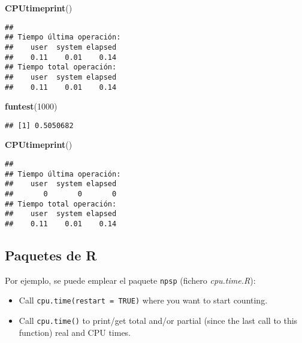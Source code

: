 \documentclass[
]{book}
\newenvironment{Shaded}{\begin{snugshade}}{\end{snugshade}}
\newcommand{\DecValTok}[1]{\textcolor[rgb]{0.00,0.00,0.81}{#1}}
\newcommand{\KeywordTok}[1]{\textcolor[rgb]{0.13,0.29,0.53}{\textbf{#1}}}
\newcommand{\NormalTok}[1]{#1}
\theoremstyle{break}
\theoremstyle{definition}
\theoremstyle{definition}
\theoremstyle{definition}
\theoremstyle{remark}
\begin{document}
\begin{Shaded}
\begin{Highlighting}[]
\KeywordTok{CPUtimeprint}\NormalTok{()}
\end{Highlighting}
\end{Shaded}

\begin{verbatim}
## 
## Tiempo última operación:
##    user  system elapsed 
##    0.11    0.01    0.14 
## Tiempo total operación:
##    user  system elapsed 
##    0.11    0.01    0.14
\end{verbatim}

\begin{Shaded}
\begin{Highlighting}[]
\KeywordTok{funtest}\NormalTok{(}\DecValTok{1000}\NormalTok{)}
\end{Highlighting}
\end{Shaded}

\begin{verbatim}
## [1] 0.5050682
\end{verbatim}

\begin{Shaded}
\begin{Highlighting}[]
\KeywordTok{CPUtimeprint}\NormalTok{()}
\end{Highlighting}
\end{Shaded}

\begin{verbatim}
## 
## Tiempo última operación:
##    user  system elapsed 
##       0       0       0 
## Tiempo total operación:
##    user  system elapsed 
##    0.11    0.01    0.14
\end{verbatim}

\hypertarget{paquetes-de-r-1}{%
\subsection{Paquetes de R}\label{paquetes-de-r-1}}

Por ejemplo, se puede emplear el paquete \texttt{npsp} (fichero \emph{cpu.time.R}):

\begin{itemize}
\item
  Call \texttt{cpu.time(restart\ =\ TRUE)} where you want to start counting.
\item
  Call \texttt{cpu.time()} to print/get total and/or partial (since the last call
  to this function) real and CPU times.
\end{itemize}
\end{document}
